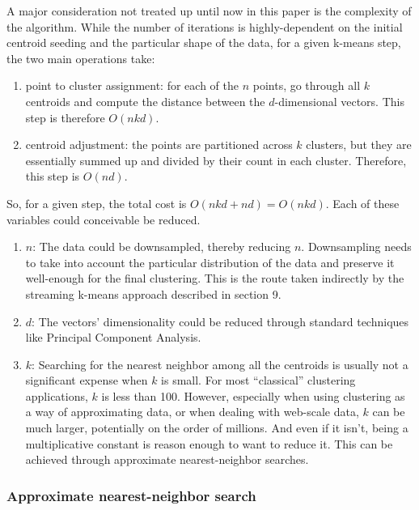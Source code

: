 \documentclass{article}
\begin{document}
A major consideration not treated up until now in this paper is the complexity of
the algorithm. While the number of iterations is highly-dependent on the
initial centroid seeding and the particular shape of the data, for a given
k-means step, the two main operations take:
\begin{enumerate}
    \item point to cluster assignment: for each of the $n$ points, go through
        all $k$ centroids and compute the distance between the $d$-dimensional
        vectors. This step is therefore $O(n k d)$.
    \item centroid adjustment: the points are partitioned across $k$ clusters,
        but they are essentially summed up and divided by their count in each
        cluster. Therefore, this step is $O(n d)$.
\end{enumerate}

So, for a given step, the total cost is $O(n k d + nd) = O(n k d)$. Each of
these variables could conceivable be reduced.

\begin{enumerate}
    \item $n$: The data could be downsampled, thereby reducing
        $n$.  Downsampling needs to take into account the particular distribution
        of the data and preserve it well-enough for
        the final clustering. This is the route taken indirectly by the
        streaming k-means approach described in section 9.
    \item $d$: The vectors' dimensionality could be reduced through standard
        techniques like Principal Component Analysis.
    \item $k$: Searching for the nearest neighbor among all the centroids is
        usually not a significant expense when $k$ is small. For most
        ``classical'' clustering applications, $k$ is less than 100. However,
        especially when using clustering as a way of approximating data, or
        when dealing with web-scale data, $k$ can be much larger, potentially
        on the order of millions. And even if it isn't, being a multiplicative
        constant is reason enough to want to reduce it.
        This can be achieved through approximate nearest-neighbor searches.
\end{enumerate}

\subsubsection{Approximate nearest-neighbor search}
\end{document}
